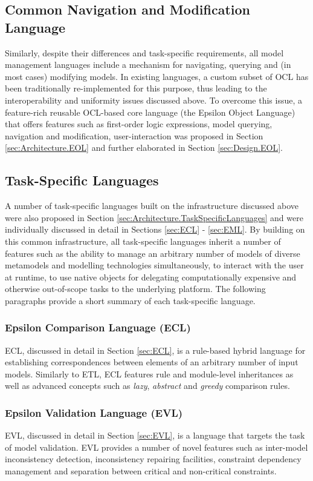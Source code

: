 \subsection{Common Navigation and Modification Language}

Similarly, despite their differences and task-specific requirements, all model management languages include a mechanism for navigating, querying and (in most cases) modifying models. In existing languages, a custom subset of OCL has been traditionally re-implemented for this purpose, thus leading to the interoperability and uniformity issues discussed above. To overcome this issue, a feature-rich reusable OCL-based core language (the Epsilon Object Language) that offers features such as first-order logic expressions, model querying, navigation and modification, user-interaction was proposed in Section \ref{sec:Architecture.EOL} and further elaborated in Section \ref{sec:Design.EOL}.

\subsection{Task-Specific Languages}

A number of task-specific languages built on the infrastructure discussed above were also proposed in Section \ref{sec:Architecture.TaskSpecificLanguages} and were individually discussed in detail in Sections \ref{sec:ECL} - \ref{sec:EML}. By building on this common infrastructure, all task-specific languages inherit a number of features such as the ability to manage an arbitrary number of models of diverse metamodels and modelling technologies simultaneously, to interact with the user at runtime, to use native objects for delegating computationally expensive and otherwise out-of-scope tasks to the underlying platform. The following paragraphs provide a short summary of each task-specific language.

\subsubsection{Epsilon Comparison Language (ECL)} ECL, discussed in detail in Section \ref{sec:ECL}, is a rule-based hybrid language for establishing correspondences between elements of an arbitrary number of input models. Similarly to ETL, ECL features rule and module-level inheritances as well as advanced concepts such as \emph{lazy}, \emph{abstract} and \emph{greedy} comparison rules.

\subsubsection{Epsilon Validation Language (EVL)} EVL, discussed in detail in Section \ref{sec:EVL}, is a language that targets the task of model validation. EVL provides a number of novel features such as inter-model inconsistency detection, inconsistency repairing facilities, constraint dependency management and separation between critical and non-critical constraints.


